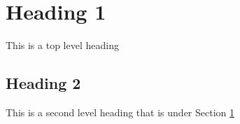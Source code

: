 \documentclass[10pt,a4paper]{article}
\begin{document}
\section{Heading 1}
\label{sec:heading1}
This is a top level heading

\subsection{Heading 2}
This is a second level heading that is under Section \ref{sec:heading1}
\end{document}
